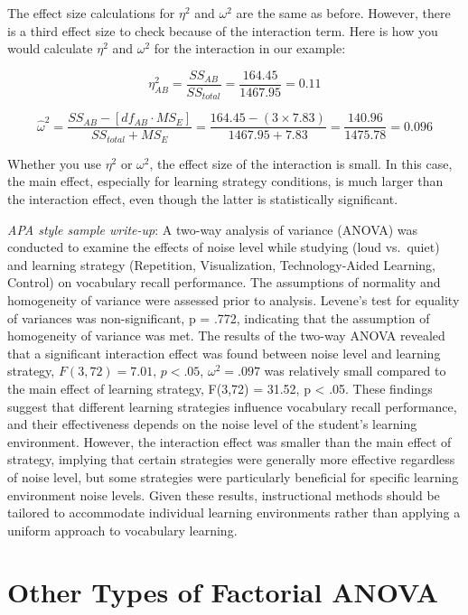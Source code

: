 \documentclass[
  letterpaper,
  DIV=11,
  numbers=noendperiod]{scrreprt}
\begin{document}
The effect size calculations for \(\eta^2\) and \(\omega^2\) are the
same as before. However, there is a third effect size to check because
of the interaction term. Here is how you would calculate \(\eta^2\) and
\(\omega^2\) for the interaction in our example:\,

\[
\eta^2_{AB} = \frac{SS_{AB}}{SS_{total}} = \frac{164.45}{1467.95} = 0.11
\]

\[
\hat{\omega}^2 = \frac{SS_{AB} - \left[df_{AB} \cdot MS_E\right]}{SS_{total} + MS_E}
= \frac{164.45 - (3 \times 7.83)}{1467.95 + 7.83}
= \frac{140.96}{1475.78} = 0.096
\]

Whether you use \(\eta^2\) or \(\omega^2\), the effect size of the
interaction is small. In this case, the main effect, especially for
learning strategy conditions, is much larger than the interaction
effect, even though the latter is statistically significant.\,\,

\emph{APA style sample write-up}: A two-way analysis of variance (ANOVA)
was conducted to examine the effects of noise level while studying (loud
vs.~quiet) and learning strategy (Repetition, Visualization,
Technology-Aided Learning, Control) on vocabulary recall performance.
The assumptions of normality and homogeneity of variance were assessed
prior to analysis. Levene's test for equality of variances was
non-significant, p = .772, indicating that the assumption of homogeneity
of variance was met. The results of the two-way ANOVA revealed that a
significant interaction effect was found between noise level and
learning strategy, \(F(3,72) = 7.01, \, p < .05\), \(\omega^2 = .097\)
was relatively small compared to the main effect of learning strategy,
F(3,72) = 31.52, p \textless{} .05. These findings suggest that
different learning strategies influence vocabulary recall performance,
and their effectiveness depends on the noise level of the student's
learning environment. However, the interaction effect was smaller than
the main effect of strategy, implying that certain strategies were
generally more effective regardless of noise level, but some strategies
were particularly beneficial for specific learning environment noise
levels. Given these results, instructional methods should be tailored to
accommodate individual learning environments rather than applying a
uniform approach to vocabulary learning.

\section{Other Types of Factorial
ANOVA}\label{other-types-of-factorial-anova}
\end{document}
